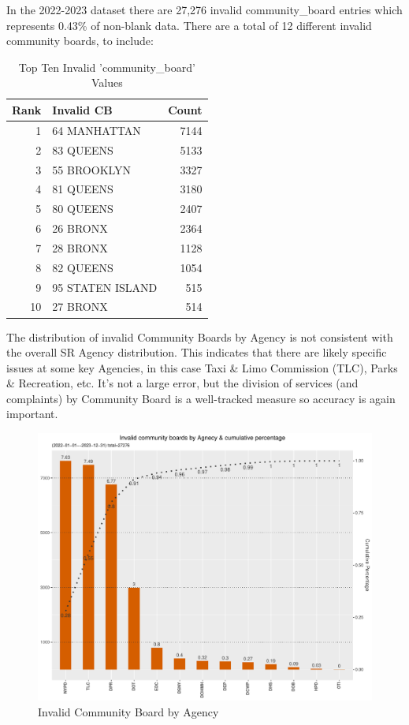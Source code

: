 \documentclass[12pt, titlepage]{article}
\begin{document}
{	In the 2022-2023 dataset there are 27,276 invalid community\_board entries which represents 0.43\% of non-blank data. 
	There are a total of 12 different invalid community boards, to include: 
	
		\begin{table}[tbp]
		\centering
		\caption{Top Ten Invalid 'community\_board' Values}
		\normalsize
		\begin{tabular}{rlr}
		\toprule
		\textbf{Rank} & \textbf{Invalid CB} & \textbf{Count} \\
			\midrule
				1 & 64 MANHATTAN & 7144 \\
				2 & 83 QUEENS & 5133 \\
				3 & 55 BROOKLYN & 3327 \\
				4 & 81 QUEENS & 3180 \\
				5 & 80 QUEENS & 2407 \\
				6 & 26 BRONX & 2364 \\
				7 & 28 BRONX & 1128 \\
				8 & 82 QUEENS & 1054 \\
				9 & 95 STATEN ISLAND & 515 \\
				10 & 27 BRONX & 514 \\
			\bottomrule
		\end{tabular}
		\end{table}
		
		The distribution of invalid Community Boards by Agency is not consistent with the overall SR Agency distribution. This indicates that there are likely
		specific issues at some key Agencies, in this case Taxi \& Limo Commission (TLC), Parks \& Recreation, etc. It's not a large error, but the division of services
		(and complaints) by Community Board is a well-tracked measure so accuracy is again important.

		\begin{figure}[tbp]
	 	 \centering
		  \includegraphics[width = \textwidth]{invalid_community_boards.pdf}
		  \caption{Invalid Community Board by Agency}
		  \label{fig:invalid_community_boards}
		\end{figure}


}
\end{document}
